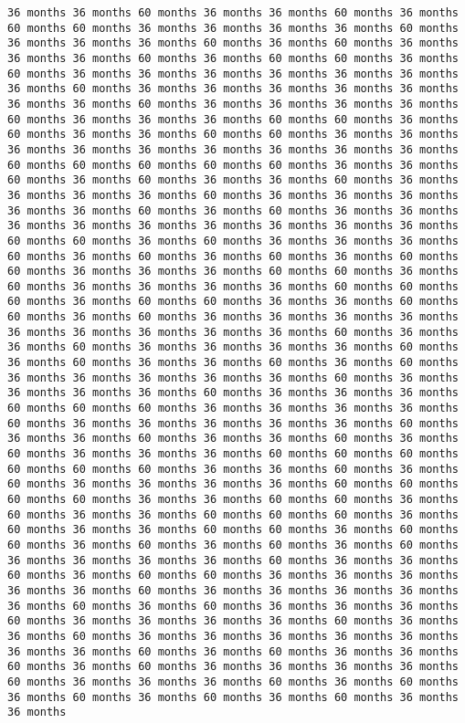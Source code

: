 \documentclass[11pt]{article}
\begin{document}
\begin{Verbatim}[commandchars=\\\{\}, frame=single, framerule=2mm, rulecolor=\color{outerrorbackground}]
36 months 36 months 60 months 36 months 36 months 60 months 36 months 60 months 60 months 36 months 36 months 36 months 36 months 60 months 36 months 36 months 36 months 60 months 36 months 60 months 36 months 36 months 36 months 60 months 36 months 60 months 60 months 36 months 60 months 36 months 36 months 36 months 36 months 36 months 36 months 36 months 60 months 36 months 36 months 36 months 36 months 36 months 36 months 36 months 60 months 36 months 36 months 36 months 36 months 60 months 36 months 36 months 36 months 60 months 60 months 36 months 60 months 36 months 36 months 60 months 60 months 36 months 36 months 36 months 36 months 36 months 36 months 36 months 36 months 36 months 60 months 60 months 60 months 60 months 60 months 36 months 36 months 60 months 36 months 60 months 36 months 36 months 60 months 36 months 36 months 36 months 36 months 60 months 36 months 36 months 36 months 36 months 36 months 60 months 36 months 60 months 36 months 36 months 36 months 36 months 36 months 36 months 36 months 36 months 36 months 60 months 60 months 36 months 60 months 36 months 36 months 36 months 60 months 36 months 60 months 36 months 60 months 36 months 60 months 60 months 36 months 36 months 36 months 60 months 60 months 36 months 60 months 36 months 36 months 36 months 36 months 60 months 60 months 60 months 36 months 60 months 60 months 36 months 36 months 60 months 60 months 36 months 60 months 36 months 36 months 36 months 36 months 36 months 36 months 36 months 36 months 36 months 60 months 36 months 36 months 60 months 36 months 36 months 36 months 36 months 60 months 36 months 60 months 36 months 36 months 60 months 36 months 60 months 36 months 36 months 36 months 36 months 36 months 60 months 36 months 36 months 36 months 36 months 60 months 36 months 36 months 36 months 60 months 60 months 60 months 36 months 36 months 36 months 36 months 60 months 36 months 36 months 36 months 36 months 36 months 60 months 36 months 36 months 60 months 36 months 36 months 60 months 36 months 60 months 36 months 36 months 36 months 60 months 60 months 60 months 60 months 60 months 60 months 36 months 36 months 60 months 36 months 60 months 36 months 36 months 36 months 36 months 60 months 60 months 60 months 60 months 36 months 36 months 60 months 60 months 36 months 60 months 36 months 36 months 60 months 60 months 60 months 36 months 60 months 36 months 36 months 60 months 60 months 36 months 60 months 60 months 36 months 60 months 36 months 60 months 36 months 60 months 36 months 36 months 36 months 36 months 60 months 36 months 36 months 60 months 36 months 60 months 60 months 36 months 36 months 36 months 36 months 36 months 60 months 36 months 36 months 36 months 36 months 36 months 60 months 36 months 60 months 36 months 36 months 36 months 60 months 36 months 36 months 36 months 36 months 60 months 36 months 36 months 60 months 36 months 36 months 36 months 36 months 36 months 36 months 36 months 60 months 36 months 60 months 36 months 36 months 60 months 36 months 60 months 36 months 36 months 36 months 36 months 60 months 36 months 36 months 36 months 60 months 36 months 60 months 36 months 60 months 36 months 60 months 36 months 60 months 36 months 36 months 
\end{Verbatim}
\end{document}
